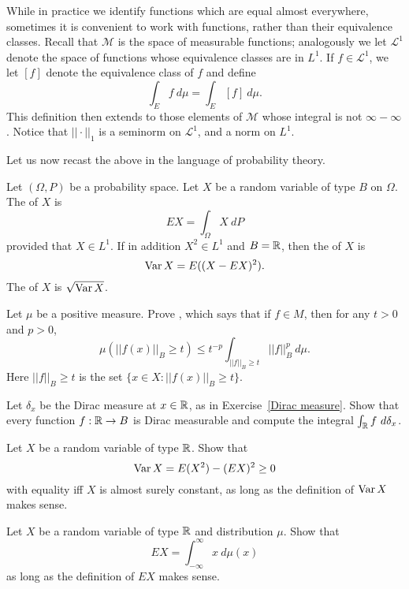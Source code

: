 \begin{subsec}
While in practice we identify functions which are equal almost everywhere, sometimes it is convenient to work with functions, rather than their equivalence classes.
Recall that $\mathcal M$ is the space of measurable functions; analogously we let $\mathcal L^1$ denote the space of functions whose equivalence classes are in $L^1$. If $f \in \mathcal L^1$, we let $[f]$ denote the equivalence class of $f$ and define
\[\int_{E} f ~d\mu = \int_{E} [f]~d\mu.\]
This definition then extends to those elements of $\mathcal M$ whose integral is not $\infty - \infty$.
Notice that $||\cdot||_1$ is a seminorm on $\mathcal L^1$, and a norm on $L^1$.
\end{subsec}

\begin{subsec}
Let us now recast the above in the language of probability theory.
\end{subsec}

\begin{definition}
Let $(\Omega, P)$ be a probability space.
Let $X$ be a random variable of type $B$ on $\Omega$.
The  of $X$ is
\[EX = \int_{\Omega} X~dP\]
provided that $X \in L^1$.
If in addition $X^2 \in L^1$ and $B = \mathbb{R}$, then the  of $X$ is
\[\operatorname{Var} X = E((X - EX)^2).\]
The  of $X$ is $\sqrt{\operatorname{Var} X}$.
\end{definition}

\begin{exercise}
\label{Chebyshev}
Let $\mu$ be a positive measure.
Prove , which says that if $f \in M$, then for any $t > 0$ and $p > 0$,
\[\mu(||f(x)||_{B} \geq t) \leq t^{-p} \int_{||f||_{B} \geq t} ||f||_B^p~d\mu.\]
Here $||f||_{B} \geq t$ is the set $\{x \in X: ||f(x)||_{B} \geq t\}$.
\end{exercise}

\begin{exercise}
Let $\delta_x$ be the Dirac measure at $x \in \mathbb{R}$, as in Exercise~\ref{Dirac measure}.
Show that every function $f: \mathbb{R} \to B$ is Dirac measurable and compute the integral $\int_{\mathbb{R}} f~d\delta_x$.
\end{exercise}

\begin{exercise}
Let $X$ be a random variable of type $\mathbb{R}$. Show that
\[\operatorname{Var} X = E(X^2) - (EX)^2 \geq 0\]
with equality iff $X$ is almost surely constant, as long as the definition of $\operatorname{Var} X$ makes sense.
\end{exercise}

\begin{exercise}
\label{integrating a distribution}
Let $X$ be a random variable of type $\mathbb{R}$ and distribution $\mu$. Show that
\[EX = \int_{-\infty}^{\infty} x ~d\mu(x)\]
as long as the definition of $EX$ makes sense.
\end{exercise}
